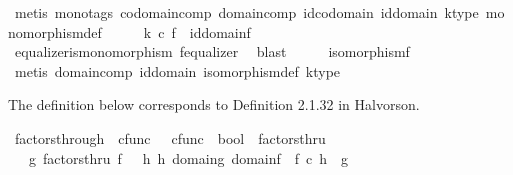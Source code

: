 \begin{isabellebody}
\ {\isacharparenleft}{\kern0pt}metis\ {\isacharparenleft}{\kern0pt}mono{\isacharunderscore}{\kern0pt}tags{\isacharparenright}{\kern0pt}\ codomain{\isacharunderscore}{\kern0pt}comp\ domain{\isacharunderscore}{\kern0pt}comp\ id{\isacharunderscore}{\kern0pt}codomain\ id{\isacharunderscore}{\kern0pt}domain\ k{\isacharunderscore}{\kern0pt}type\ monomorphism{\isacharunderscore}{\kern0pt}def{\isacharparenright}{\kern0pt}\isanewline
\ \ \isamarkupfalse%
\ \isamarkupfalse%
\ {\isachardoublequoteopen}k\ {\isasymcirc}\isactrlsub c\ f\ {\isacharequal}{\kern0pt}\ id{\isacharparenleft}{\kern0pt}domain{\isacharparenleft}{\kern0pt}f{\isacharparenright}{\kern0pt}{\isacharparenright}{\kern0pt}{\isachardoublequoteclose}\isanewline
\ \ \ \ \isamarkupfalse%
\ equalizer{\isacharunderscore}{\kern0pt}is{\isacharunderscore}{\kern0pt}monomorphism\ f{\isacharunderscore}{\kern0pt}equalizer\ \isamarkupfalse%
\ blast\isanewline
\ \ \isamarkupfalse%
\ \isamarkupfalse%
\ {\isachardoublequoteopen}isomorphism{\isacharparenleft}{\kern0pt}f{\isacharparenright}{\kern0pt}{\isachardoublequoteclose}\isanewline
\ \ \ \ \isamarkupfalse%
\ {\isacharparenleft}{\kern0pt}metis\ domain{\isacharunderscore}{\kern0pt}comp\ id{\isacharunderscore}{\kern0pt}domain\ isomorphism{\isacharunderscore}{\kern0pt}def\ k{\isacharunderscore}{\kern0pt}type{\isacharparenright}{\kern0pt}\ \ \isanewline
{}\isamarkupfalse%
%
\endisatagproof
{\isafoldproof}%
%
\isadelimproof
%
\endisadelimproof
%
\isadelimdocument
%
\endisadelimdocument
%
\isatagdocument
%
\isamarkuptrue%
%
\endisatagdocument
{\isafolddocument}%
%
\isadelimdocument
%
\endisadelimdocument
%
\begin{isamarkuptext}%
The definition below corresponds to Definition 2.1.32 in Halvorson.%
\end{isamarkuptext}\isamarkuptrue%
\isamarkupfalse%
\ factors{\isacharunderscore}{\kern0pt}through\ {\isacharcolon}{\kern0pt}{\isacharcolon}{\kern0pt}\ {\isachardoublequoteopen}cfunc\ \ {\isasymRightarrow}\ cfunc\ {\isasymRightarrow}\ bool{\isachardoublequoteclose}\ {\isacharparenleft}{\kern0pt}\ {\isachardoublequoteopen}factorsthru{\isachardoublequoteclose}\ {}{}{\isacharparenright}{\kern0pt}\isanewline
\ \ \ {\isachardoublequoteopen}g\ factorsthru\ f\ {\isasymlongleftrightarrow}\ {\isacharparenleft}{\kern0pt}{\isasymexists}\ h{\isachardot}{\kern0pt}\ {\isacharparenleft}{\kern0pt}h{\isacharcolon}{\kern0pt}\ domain{\isacharparenleft}{\kern0pt}g{\isacharparenright}{\kern0pt}{\isasymrightarrow}\ domain{\isacharparenleft}{\kern0pt}f{\isacharparenright}{\kern0pt}{\isacharparenright}{\kern0pt}\ {\isasymand}\ f\ {\isasymcirc}\isactrlsub c\ h\ {\isacharequal}{\kern0pt}\ g{\isacharparenright}{\kern0pt}{\isachardoublequoteclose}\isanewline

\end{isabellebody}
